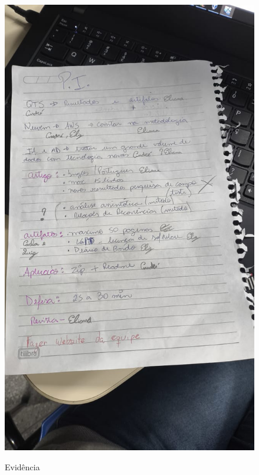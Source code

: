 \documentclass[
landscape,
  a4paper,%
  12pt,%
  english,%
  brazilian,%
]{article}
\begin{document}
\begin{figure}[h]
\caption{Evidência}
    \centering
    \begin{minipage}[t]{0.30\textwidth}
        \centering
        \includegraphics[width=\textwidth]{evidencias/img1.jpeg}
        \label{fig:exemplo1}
    \end{minipage}
\end{figure}
\end{document}
